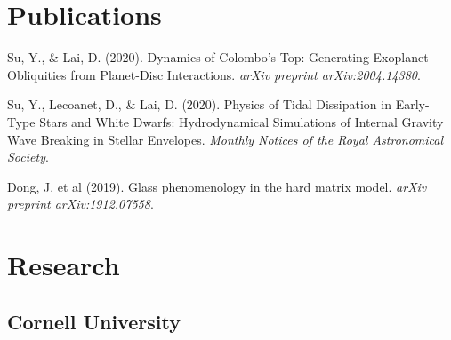 \documentclass[]{yubo-resume-openfont}
\begin{document}
\begin{minipage}[t]{0.66\textwidth}


\section{Publications}
\vspace{\topsep} %
\begin{tightemize}
    \item Su, Y., \& Lai, D. (2020).
        Dynamics of Colombo's Top: Generating Exoplanet Obliquities from
        Planet-Disc Interactions. \emph{arXiv preprint arXiv:2004.14380}.
    \item Su, Y., Lecoanet, D., \& Lai, D. (2020).
        Physics of Tidal Dissipation in Early-Type Stars and White Dwarfs:
        Hydrodynamical Simulations of Internal Gravity Wave Breaking in
        Stellar Envelopes. \emph{Monthly Notices of the Royal Astronomical
        Society}.
    \item Dong, J. et al (2019).
        Glass phenomenology in the hard matrix model.
        \emph{arXiv preprint arXiv:1912.07558}.
\end{tightemize}
\sectionsep
\section{Research}

\subsection{Cornell University}
\vspace{\topsep} %
\sectionsep


\end{minipage}
\end{document}
